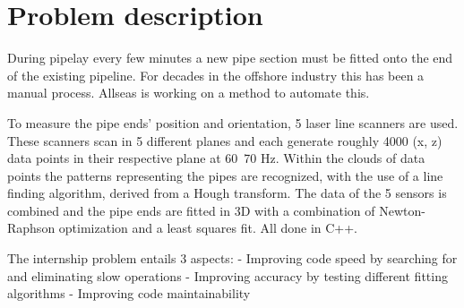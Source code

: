 \section{Problem description}
\label{sec:problem}
During pipelay every few minutes a new pipe section must be fitted onto the end of the existing pipeline. For decades in the offshore industry this has been a manual process. Allseas is working on a method to automate this.
 
To measure the pipe ends' position and orientation, 5 laser line scanners are used. These scanners scan in 5 different planes and each generate roughly 4000 (x, z) data points in their respective plane at 60~70 Hz. Within the clouds of data points the patterns representing the pipes are recognized, with the use of a line finding algorithm, derived from a Hough transform. The data of the 5 sensors is combined and the pipe ends are fitted in 3D with a combination of Newton-Raphson optimization and a least squares fit. All done in C++.
 
The internship problem entails 3 aspects:
- Improving code speed by searching for and eliminating slow operations
- Improving accuracy by testing different fitting algorithms
- Improving code maintainability